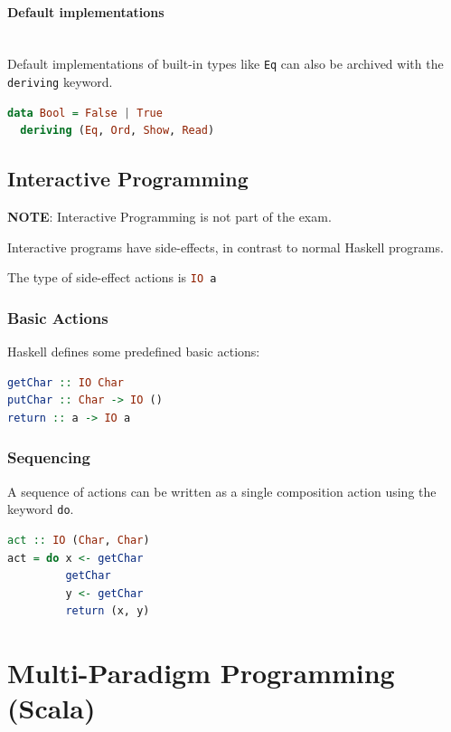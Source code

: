 \paragraph{Default implementations} \hfill \\

Default implementations of built-in types like \lstinline|Eq| can also be archived with the \lstinline|deriving| keyword.
\begin{lstlisting}[language=haskell]
data Bool = False | True
  deriving (Eq, Ord, Show, Read)
\end{lstlisting}

\subsection{Interactive Programming}

\textbf{NOTE}: Interactive Programming is not part of the exam.

Interactive programs have side-effects, in contrast to normal Haskell programs.

The type of side-effect actions is \lstinline[language=haskell]|IO a|

\subsubsection{Basic Actions}

Haskell defines some predefined basic actions:

\begin{lstlisting}[language=haskell]
getChar :: IO Char
putChar :: Char -> IO ()
return :: a -> IO a
\end{lstlisting}

\subsubsection{Sequencing}

A sequence of actions can be written as a single composition action using the keyword \lstinline|do|.

\begin{lstlisting}[language=haskell]
act :: IO (Char, Char)
act = do x <- getChar
         getChar
         y <- getChar
         return (x, y)
\end{lstlisting}

\section{Multi-Paradigm Programming (Scala)}




